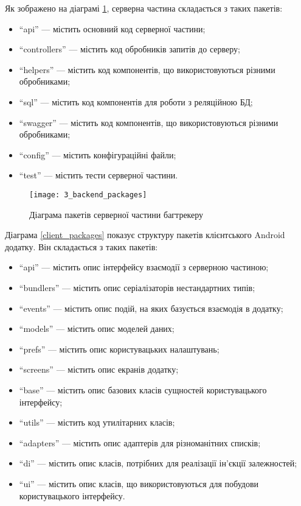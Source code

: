 \documentclass[../main.tex]{subfiles}
\begin{document}
			Як зображено на діаграмі \ref{server_packages}, серверна частина складається з таких пакетів:
			\begin{itemize}
				\item \enquote{api} — містить основний код серверної частини;
				\item \enquote{controllers} — містить код обробників запитів до серверу;
				\item \enquote{helpers} — містить код компонентів, що використовуються різними обробниками;
				\item \enquote{sql} — містить код компонентів для роботи з реляційною БД;
				\item \enquote{swagger} — містить код компонентів, що використовуються різними обробниками;
				\item \enquote{config} — містить конфігураційні файли;
				\item \enquote{test} — містить тести серверної частини.
			\end{itemize}
			
			\begin{figure}[H]
				\centering
				\texttt{[image: 3\_backend\_packages]}
				\caption{Діаграма пакетів серверної частини багтрекеру}
				\label{server_packages}
			\end{figure}
			
			
			Діаграма \ref{client_packages} показує структуру пакетів клієнтського Android додатку. Він складається з таких пакетів:
			\begin{itemize}
				\item \enquote{api} — містить опис інтерфейсу взаємодії з серверною частиною;
				\item \enquote{bundlers} — містить опис серіалізаторів нестандартних типів;
				\item \enquote{events} — містить опис подій, на яких базується взаємодія в додатку;
				\item \enquote{models} — містить опис моделей даних;
				\item \enquote{prefs} — містить опис користувацьких налаштувань;
				\item \enquote{screens} — містить опис екранів додатку;
				\item \enquote{base} — містить опис базових класів сущностей користувацького інтерфейсу;
				\item \enquote{utils} — містить код утилітарних класів;
				\item \enquote{adapters} — містить опис адаптерів для різноманітних списків;
				\item \enquote{di} — містить опис класів, потрібних для реалізації ін'єкції залежностей;
				\item \enquote{ui} — містить опис класів, що використовуються для побудови користувацького інтерфейсу.
			\end{itemize}
			
\end{document}
